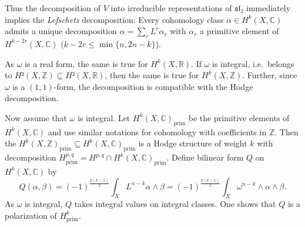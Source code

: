 \documentclass[english]{short-notes}
\begin{document}
Thus the decomposition of $V$ into irreducible representations of $\mathfrak{sl₂}$ immediately implies the \emph{Lefschetz} decomposition:
Every cohomology class $α ∈ H^k(X,ℂ)$ admits a unique decomposition $α = \sum_r L^r α_r$ with $α_r$ a primitive element of $H^{k-2r}(X,ℂ)$ ($k-2r ≤ \min\{n,2n-k\}$).

As $ω$ is a real form, the same is true for $H^k(X,ℝ)$.
If $ω$ is integral, i.e.\ belongs to $H²(X,ℤ) ⊆ H²(X,ℝ)$, then the same is true for $H^k(X,ℤ)$.
Further, since $ω$ is a $(1,1)$-form, the decomposition is compatible with the Hodge decomposition.

Now assume that $ω$ is integral.
Let $H^k(X,ℂ)_{\mathrm{prim}}$ be the primitive elements of $H^k(X,ℂ)$ and use similar notations for cohomology with coefficients in $ℤ$.
Then the $H^k(X,ℤ)_{\mathrm{prim}} ⊆ H^k(X,ℂ)_{\mathrm{prim}}$ is a Hodge structure of weight $k$ with decomposition $H^{p,q}_{\mathrm{prim}} = H^{p,q} ∩ H^k(X,ℂ)_{\mathrm{prim}}$.
Define bilinear form $Q$ on $H^k(X,ℂ)$ by 
\[
Q(α,β) = (-1)^{\frac{k(k-1)}2}∫_X L^{n-k}α ∧ β = (-1)^{\frac{k(k-1)}2}∫_X ω^{n-k} ∧ α ∧ β.
\]
As $ω$ is integral, $Q$ takes integral values on integral classes.
One shows that $Q$ is a polarization of $H^k_{\mathrm{prim}}$.
\end{document}
